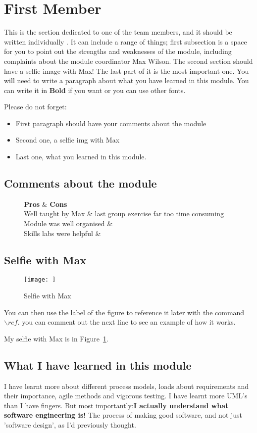 \section{First Member}
This is the section dedicated to one of the team members, and it should be written individually . It can include a range of things; first subsection is a space for you to point out the strengths and weaknesses of the module, including complaints about the module coordinator Max Wilson. The second section should have a selfie image with Max! The last part of it is the most important one. You will need to write a paragraph about what you have learned in this module. You can write it in \textbf{Bold} if you want or you can use other fonts. 

Please do not forget:
\begin{itemize}
	\item First paragraph should have your comments about the module
	\item Second one, a selfie img with Max
	\item Last one, what you learned in this module.
\end{itemize}

\subsection{Comments about the module}
\begin{figure}
	\begin{tabular}[|l | l|]
	\textbf{Pros} & \textbf{Cons} \\ \hline
	Well taught by Max & last group exercise far too time consuming \\ \hline
	Module was well organised & \\ \hline 
	Skills labs were helpful & \\ \hline
	\end{tabular}
\end{figure}

\subsection{Selfie with Max}

\begin{figure}[h]
\caption{Selfie with Max}
\centering
\texttt{[image: ]}
\label{fig:selfie}
\end{figure}

You can then use the label of the figure to reference it later with the command ${\backslash}ref$. you can comment out the next line to see an example of how it works.

My selfie with Max is in  Figure~\ref{fig:selfie}.

\subsection{What I have learned in this module}
I have learnt more about different process models, loads about requirements and their importance, agile methods and vigorous testing. I have learnt more UML's than I have fingers. But most importantly:\textbf{I actually understand what software engineering is!} The process of making good software, and not just 'software design', as I'd previously thought. 